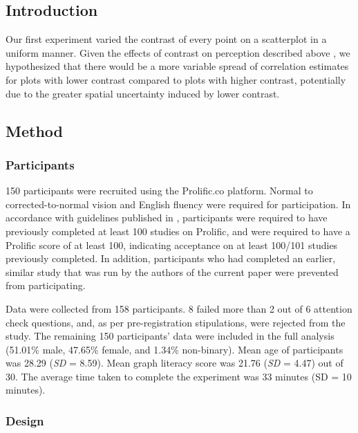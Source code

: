 \documentclass[preprint, 3p,
authoryear]{elsarticle} %
\begin{document}
\hypertarget{introduction-1}{%
\subsection{Introduction}\label{introduction-1}}

Our first experiment varied the contrast of every point on a scatterplot
in a uniform manner. Given the effects of contrast on perception
described above \citep{champion_2017, wehrhahn_1990}, we hypothesized
that there would be a more variable spread of correlation estimates for
plots with lower contrast compared to plots with higher contrast,
potentially due to the greater spatial uncertainty induced by lower
contrast.

\hypertarget{method}{%
\subsection{Method}\label{method}}

\hypertarget{participants}{%
\subsubsection{Participants}\label{participants}}

150 participants were recruited using the Prolific.co platform. Normal
to corrected-to-normal vision and English fluency were required for
participation. In accordance with guidelines published in
\citet{peer_2021}, participants were required to have previously
completed at least 100 studies on Prolific, and were required to have a
Prolific score of at least 100, indicating acceptance on at least
100/101 studies previously completed. In addition, participants who had
completed an earlier, similar study that was run by the authors of the
current paper were prevented from participating.

Data were collected from 158 participants. 8 failed more than 2 out of 6
attention check questions, and, as per pre-registration stipulations,
were rejected from the study. The remaining 150 participants' data were
included in the full analysis (51.01\% male, 47.65\% female, and 1.34\%
non-binary). Mean age of participants was 28.29 (\emph{SD} = 8.59). Mean
graph literacy score was 21.76 (\emph{SD} = 4.47) out of 30. The average
time taken to complete the experiment was 33 minutes (SD = 10 minutes).

\hypertarget{design}{%
\subsubsection{Design}\label{design}}
\end{document}
